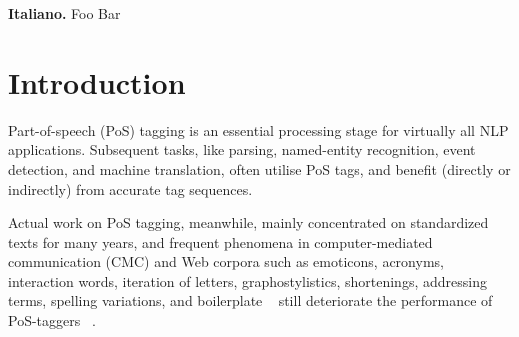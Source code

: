 \documentclass[11pt]{article}
\title{\mytitle}
\author{Egon W.~Stemle \\
    Institute for Specialised Communication and Multilingualism \\
    EURAC Research \\
    Bolzano/Bozen, Italy
    {\tt egon.stemle@eurac.edu}}
\date{}
\begin{document}
\maketitle

\begin{abstract} %
\textbf{English.}  
This article describes the system that participated in the \emph{POS tagging
for Italian Social Media Texts} (PoSTWITA) task of the 5th periodic evaluation
campaign of Natural Language Processing (NLP) and speech tools for the Italian
language EVALITA 2016.

The system continues the work of  with minor
modifications and different data sets.  
It combines a small assertion of trending techniques, which implement matured
methods, from NLP and ML to achieve competitive results on PoS tagging of
Italian Twitter texts; in particular, the system uses word embeddings and
character-level representations of word beginnings and endings in a LSTM RNN
architecture.  
Labelled data (Italian UD corpus, DiDi and PoSTWITA) and unlabbelled data
(Italian C4Corpus and PAIS{\`A}) were used for training.

The system is available under the APLv2 open-source license.
\end{abstract}

\begin{abstract-alt}
    \textrm{\bf{Italiano.}} Foo Bar
\end{abstract-alt}

 


\section{Introduction} %
\label{sec:intro}

Part-of-speech (PoS) tagging is an essential processing stage for virtually all
NLP applications.
Subsequent tasks, like parsing, named-entity recognition, event
detection, and machine translation, often utilise PoS tags, and benefit
(directly or indirectly) from accurate tag sequences.

Actual work on PoS tagging, meanwhile, mainly concentrated on standardized
texts for many years, and frequent phenomena in computer-mediated communication
(CMC) and Web corpora such as emoticons, acronyms, interaction words, iteration
of letters, graphostylistics, shortenings, addressing terms, spelling
variations, and boilerplate%
~\cite{androutsopoulos2007,BernardiniBaroniEvert2008,beisswenger2013} still
deteriorate the performance of PoS-taggers%
~\cite{giesbrecht2009,baldwin-EtAl:2013:IJCNLP}.
\end{document}
